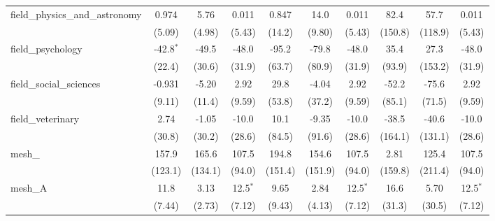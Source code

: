 \begin{tabular}{lccccccccc}
   field\_physics\_and\_astronomy                              & 0.974        & 5.76          & 0.011         & 0.847       & 14.0         & 0.011         & 82.4      & 57.7    & 0.011\\   
                                                               & (5.09)       & (4.98)        & (5.43)        & (14.2)      & (9.80)       & (5.43)        & (150.8)   & (118.9) & (5.43)\\   
   field\_psychology                                           & -42.8$^{*}$  & -49.5         & -48.0         & -95.2       & -79.8        & -48.0         & 35.4      & 27.3    & -48.0\\   
                                                               & (22.4)       & (30.6)        & (31.9)        & (63.7)      & (80.9)       & (31.9)        & (93.9)    & (153.2) & (31.9)\\   
   field\_social\_sciences                                     & -0.931       & -5.20         & 2.92          & 29.8        & -4.04        & 2.92          & -52.2     & -75.6   & 2.92\\   
                                                               & (9.11)       & (11.4)        & (9.59)        & (53.8)      & (37.2)       & (9.59)        & (85.1)    & (71.5)  & (9.59)\\   
   field\_veterinary                                           & 2.74         & -1.05         & -10.0         & 10.1        & -9.35        & -10.0         & -38.5     & -40.6   & -10.0\\   
                                                               & (30.8)       & (30.2)        & (28.6)        & (84.5)      & (91.6)       & (28.6)        & (164.1)   & (131.1) & (28.6)\\   
   mesh\_                                                      & 157.9        & 165.6         & 107.5         & 194.8       & 154.6        & 107.5         & 2.81      & 125.4   & 107.5\\   
                                                               & (123.1)      & (134.1)       & (94.0)        & (151.4)     & (151.9)      & (94.0)        & (159.8)   & (211.4) & (94.0)\\   
   mesh\_A                                                     & 11.8         & 3.13          & 12.5$^{*}$    & 9.65        & 2.84         & 12.5$^{*}$    & 16.6      & 5.70    & 12.5$^{*}$\\   
                                                               & (7.44)       & (2.73)        & (7.12)        & (9.43)      & (4.13)       & (7.12)        & (31.3)    & (30.5)  & (7.12)\\   

\end{tabular}
